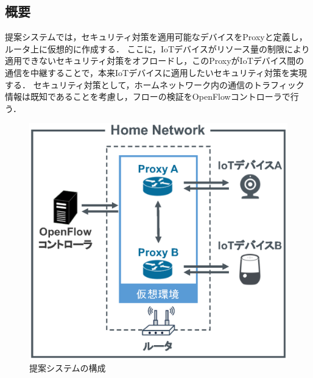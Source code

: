 \documentclass[Japanese]{dicomopapers}
\begin{document}
\subsection{概要}
提案システムでは，セキュリティ対策を適用可能なデバイスをProxyと定義し，ルータ上に仮想的に作成する．
ここに，IoTデバイスがリソース量の制限により適用できないセキュリティ対策をオフロードし，このProxyがIoTデバイス間の通信を中継することで，本来IoTデバイスに適用したいセキュリティ対策を実現する．
セキュリティ対策として，ホームネットワーク内の通信のトラフィック情報は既知であることを考慮し，フローの検証をOpenFlowコントローラで行う．

\begin{figure}[!tb]
	\centering
	\includegraphics[width=\linewidth]{img/system.eps}
	\caption{提案システムの構成}
	\label{fig:system}
\end{figure}
\end{document}
